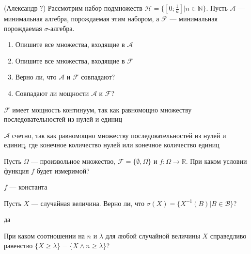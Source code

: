 \begin{problem}
(Александр ?) Рассмотрим набор подмножеств
$\mathcal{H}=\{[0;\frac{1}{n}]|n\in \mathbb{N}\}$. Пусть
$\mathcal{A}$ — минимальная алгебра, порождаемая этим набором, а
$\mathcal{F}$ — минимальная
порождаемая $\sigma$-алгебра.
\begin{enumerate}
\item Опишите все множества, входящие в $\mathcal{A}$
\item  Опишите все множества, входящие в $\mathcal{F}$
\item  Верно ли, что $\mathcal{A}$ и $\mathcal{F}$ совпадают?
\item Совпадают ли мощности $\mathcal{A}$ и $\mathcal{F}$?
\end{enumerate}


\begin{sol}

$\mathcal{F}$ имеет мощность континуум, так как равномощно множеству последовательностей из нулей и единиц

$\mathcal{A}$ счетно, так как равномощно множеству последовательностей из нулей и единиц, где конечное количество нулей или конечное количество единиц

\end{sol}
\end{problem}

\begin{problem}
Пусть $\Omega$ — произвольное множество,
$\mathcal{F}=\{\emptyset,\Omega\}$ и $f:\Omega\rightarrow
\mathbb{R}$. При
каком условии функция $f$ будет измеримой?

\begin{sol}
$f$ — константа
\end{sol}
\end{problem}

\begin{problem}
Пусть $X$ — случайная величина. Верно ли, что
$\sigma(X)=\{X^{-1}(B)|B \in \mathcal{B} \}$?

\begin{sol}
да
\end{sol}
\end{problem}

\begin{problem}
При каком соотношении на $n$ и $\lambda$ для любой случайной
величины $X$ справедливо равенство $\{X\ge \lambda\}=\{X\wedge
n\ge\lambda\}$?

\begin{sol}

\end{sol}
\end{problem}

